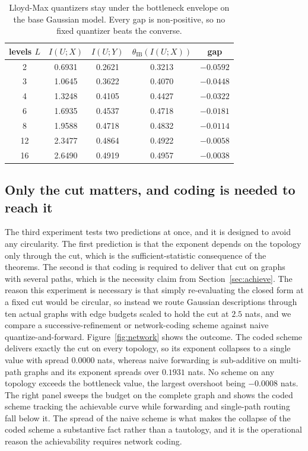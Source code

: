 \documentclass[journal]{IEEEtran}
\theoremstyle{definition}
\theoremstyle{remark}
\newcommand{\tib}{\theta_{\mathrm{IB}}}
\begin{document}
\begin{table}[t]
\centering
\caption{Lloyd-Max quantizers stay under the bottleneck envelope on the base Gaussian model. Every gap is
non-positive, so no fixed quantizer beats the converse.}
\label{tab:envelope}
\renewcommand{\arraystretch}{1.15}
\begin{tabular}{@{}ccccc@{}}
\toprule
levels $L$ & $I(U;X)$ & $I(U;Y)$ & $\tib(I(U;X))$ & gap \\
\midrule
2  & 0.6931 & 0.2621 & 0.3213 & $-0.0592$ \\
3  & 1.0645 & 0.3622 & 0.4070 & $-0.0448$ \\
4  & 1.3248 & 0.4105 & 0.4427 & $-0.0322$ \\
6  & 1.6935 & 0.4537 & 0.4718 & $-0.0181$ \\
8  & 1.9588 & 0.4718 & 0.4832 & $-0.0114$ \\
12 & 2.3477 & 0.4864 & 0.4922 & $-0.0058$ \\
16 & 2.6490 & 0.4919 & 0.4957 & $-0.0038$ \\
\bottomrule
\end{tabular}
\end{table}

\subsection{Only the cut matters, and coding is needed to reach it}
The third experiment tests two predictions at once, and it is designed to avoid any circularity. The first
prediction is that the exponent depends on the topology only through the cut, which is the sufficient-statistic
consequence of the theorems. The second is that coding is required to deliver that cut on graphs with several
paths, which is the necessity claim from Section~\ref{sec:achieve}. The reason this experiment is necessary is
that simply re-evaluating the closed form at a fixed cut would be circular, so instead we route Gaussian
descriptions through ten actual graphs with edge budgets scaled to hold the cut at $2.5$ nats, and we compare a
successive-refinement or network-coding scheme against naive quantize-and-forward. Figure~\ref{fig:network} shows
the outcome. The coded scheme delivers exactly the cut on every topology, so its exponent collapses to a single
value with spread $0.0000$ nats, whereas naive forwarding is sub-additive on multi-path graphs and its exponent
spreads over $0.1931$ nats. No scheme on any topology exceeds the bottleneck value, the largest overshoot being
$-0.0008$ nats. The right panel sweeps the budget on the complete graph and shows the coded scheme tracking the
achievable curve while forwarding and single-path routing fall below it. The spread of the naive scheme is what
makes the collapse of the coded scheme a substantive fact rather than a tautology, and it is the operational
reason the achievability requires network coding.
\end{document}

